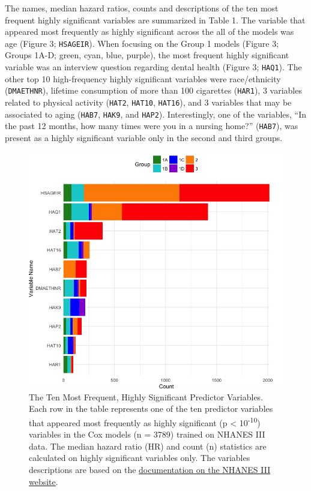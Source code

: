 \documentclass[12pt,twoside]{reedthesis}
\theoremstyle{definition}
\theoremstyle{definition}
\theoremstyle{definition}
\theoremstyle{remark}
\begin{document}
The names, median hazard ratios, counts and descriptions of the ten most
frequent highly significant variables are summarized in Table 1. The
variable that appeared most frequently as highly significant across the
all of the models was age (Figure 3; \texttt{HSAGEIR}). When focusing on
the Group 1 models (Figure 3; Groups 1A-D; green, cyan, blue, purple),
the most frequent highly significant variable was an interview question
regarding dental health (Figure 3; \texttt{HAQ1}). The other top 10
high-frequency highly significant variables were race/ethnicity
(\texttt{DMAETHNR}), lifetime consumption of more than 100 cigarettes
(\texttt{HAR1}), 3 variables related to physical activity
(\texttt{HAT2}, \texttt{HAT10}, \texttt{HAT16}), and 3 variables that
may be associated to aging (\texttt{HAB7}, \texttt{HAK9}, and
\texttt{HAP2}). Interestingly, one of the variables, ``In the past 12
months, how many times were you in a nursing home?'' (\texttt{HAB7}),
was present as a highly significant variable only in the second and
third groups.
\begin{figure}
\centering
\includegraphics[width=1\textwidth,height=\textheight]{img/3-varbar-final100dpi.png}
\caption{The Ten Most Frequent, Highly Significant Predictor Variables.
Each row in the table represents one of the ten predictor variables that
appeared most frequently as highly significant (p \textless{}
10\textsuperscript{-10}) variables in the Cox models (n = 3789) trained
on NHANES III data. The median hazard ratio (HR) and count (n)
statistics are calculated on highly significant variables only. The
variables descriptions are based on the
\href{https://wwwn.cdc.gov/nchs/nhanes/nhanes3/DataFiles.aspx}{documentation
on the NHANES III website}.}
\end{figure}
\end{document}
